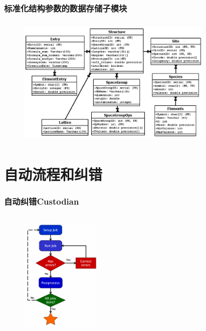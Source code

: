 \documentclass[cjk,slidestop,compress,mathserif,blue]{beamer}
\begin{document}
\frame
{
	\frametitle{标准化结构参数的数据存储子模块}
\begin{figure}[h!]
\centering
\vspace*{-0.2in}
\includegraphics[height=2.5in,width=3.7in,viewport=0 0 850 540,clip]{Figures/MP_database_structure.png}
\caption{\fontsize{7.2pt}{4.2pt}}%
\label{MP_structure_data}
\end{figure} 
}

\section{自动流程和纠错}
%
\frame
{
	\frametitle{自动纠错\textrm{Custodian}}
\begin{figure}[h!]
\centering
\vspace*{-0.1in}
\includegraphics[height=2.5in,width=1.5in,viewport=0 0 350 520,clip]{Figures/MP_custodian.png}
\caption{\fontsize{7.2pt}{4.2pt}}%
\label{MP_custodian}
\end{figure} 
}
\end{document}
